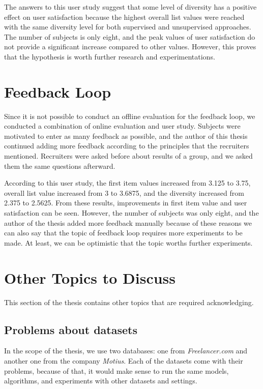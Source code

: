The answers to this user study suggest that some level of diversity has a positive effect on user satisfaction because the highest overall list values were reached with the same diversity level for both supervised and unsupervised approaches. The number of subjects is only eight, and the peak values of user satisfaction do not provide a significant increase compared to other values. However, this proves that the hypothesis is worth further research and experimentations.

\section{Feedback Loop}\label{discussion:feedback-loop}

Since it is not possible to conduct an offline evaluation for the feedback loop, we conducted a combination of online evaluation and user study. Subjects were motivated to enter as many feedback as possible, and the author of this thesis continued adding more feedback according to the principles that the recruiters mentioned. Recruiters were asked before about results of a group, and we asked them the same questions afterward. 

According to this user study, the first item values increased from 3.125 to 3.75, overall list value increased from 3 to 3.6875, and the diversity increased from 2.375 to 2.5625. From these results, improvements in first item value and user satisfaction can be seen. However, the number of subjects was only eight, and the author of the thesis added more feedback manually because of these reasons we can also say that the topic of feedback loop requires more experiments to be made. At least, we can be optimistic that the topic worths further experiments.

\section{Other Topics to Discuss}

This section of the thesis contains other topics that are required acknowledging.

\subsection{Problems about datasets}

In the scope of the thesis, we use two databases: one from \textit{Freelancer.com} and another one from the company \textit{Motius}. Each of the datasets come with their problems, because of that, it would make sense to run the same models, algorithms, and experiments with other datasets and settings.

